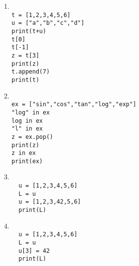 \exer{}
\setcounter{numques}{0}


\begin{enumerate}[label=\emph{\alph*)}]
\item 
\begin{lstlisting}

t = [1,2,3,4,5,6]
u = ["a","b","c","d"]
print(t+u)
t[0]
t[-1]
z = t[3]
print(z)
t.append(7)
print(t)
\end{lstlisting}

\item 
\begin{lstlisting}

ex = ["sin","cos","tan","log","exp"]
"log" in ex
log in ex
"l" in ex
z = ex.pop()
print(z)
z in ex
print(ex)
\end{lstlisting}

\item 
\begin{lstlisting}

  u = [1,2,3,4,5,6]
  L = u
  u = [1,2,3,42,5,6]
  print(L)
\end{lstlisting}

\item 
\begin{lstlisting}

  u = [1,2,3,4,5,6]
  L = u
  u[3] = 42
  print(L)
\end{lstlisting}

\end{enumerate}